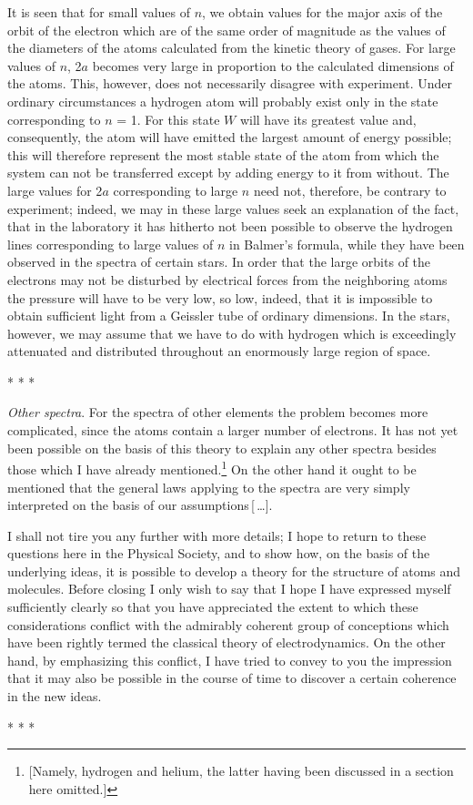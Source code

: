 It is seen that for small values of $n$, we obtain values for the
major axis of the orbit of the electron which are of the same order of
magnitude as the values of the diameters of the atoms calculated from
the kinetic theory of gases. For large values of $n$, 2$a$
becomes very large in proportion to the calculated dimensions of the
atoms. This, however, does not necessarily disagree with experiment.
Under ordinary circumstances a hydrogen atom will probably exist only in
the state corresponding to $n$ = 1. For this state $W$ will
have its greatest value and, consequently, the atom will have emitted
the largest amount of energy possible; this will therefore represent the
most stable state of the atom from which the system can not be
transferred except by adding energy to it from without. The large values
for 2$a$ corresponding to large $n$ need not, therefore, be
contrary to experiment; indeed, we may in these large values seek an
explanation of the fact, that in the laboratory it has hitherto not been
possible to observe the hydrogen lines corresponding to large values of
$n$ in Balmer's formula, while they have been observed in the
spectra of certain stars. In order that the large orbits of the
electrons may not be disturbed by electrical forces from the neighboring
atoms the pressure will have to be very low, so low, indeed, that it is
impossible to obtain sufficient light from a Geissler tube of ordinary
dimensions. In the stars, however, we may assume that we have to do with
hydrogen which is exceedingly attenuated and distributed throughout an
enormously large region of space.\\
\centerline{* * *}
%
\emph{Other spectra}. For the spectra of other elements the problem
becomes more complicated, since the atoms contain a larger number of
electrons. It has not yet been possible on the basis of this theory to
explain any other spectra besides those which I have already
mentioned.\footnote{{[}Namely, hydrogen and helium, the latter having
  been discussed in a section here omitted.{]}} On the other hand it
ought to be mentioned that the general laws applying to the spectra are
very simply interpreted on the basis of our assumptions\,[\,\ldots].

I shall not tire you any further with more details; I hope to return to
these questions here in the Physical Society, and to show how, on the
basis of the underlying ideas, it is possible to develop a theory for
the structure of atoms and molecules. Before closing I only wish to say
that I hope I have expressed myself sufficiently clearly so that you
have appreciated the extent to which these considerations conflict with
the admirably coherent group of conceptions which have been rightly
termed the classical theory of electrodynamics. On the other hand, by
emphasizing this conflict, I have tried to convey to you the impression
that it may also be possible in the course of time to discover a certain
coherence in the new ideas.\\
\centerline{* * *}
%
